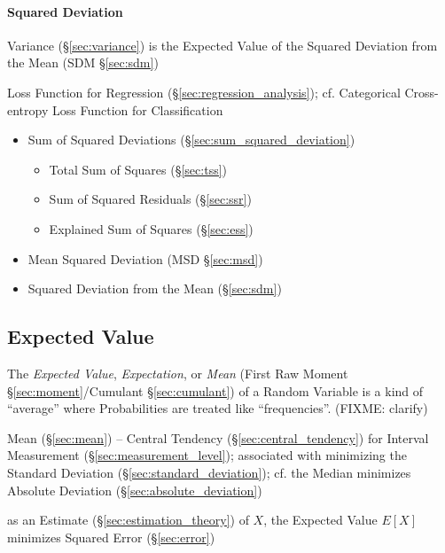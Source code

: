 \paragraph{Squared Deviation}\label{sec:squared_deviation}\hfill

\fist Variance (\S\ref{sec:variance}) is the Expected Value of the Squared
Deviation from the Mean (SDM \S\ref{sec:sdm})

\fist Loss Function for Regression (\S\ref{sec:regression_analysis}); cf.
Categorical Cross-entropy Loss Function for Classification

\begin{itemize}
  \item Sum of Squared Deviations (\S\ref{sec:sum_squared_deviation})
    \begin{itemize}
      \item Total Sum of Squares (\S\ref{sec:tss})
      \item Sum of Squared Residuals (\S\ref{sec:ssr})
      \item Explained Sum of Squares (\S\ref{sec:ess})
    \end{itemize}
  \item Mean Squared Deviation (MSD \S\ref{sec:msd})
  \item Squared Deviation from the Mean (\S\ref{sec:sdm})
\end{itemize}



\subsection{Expected Value}\label{sec:expected_value}

The \emph{Expected Value}, \emph{Expectation}, or \emph{Mean} (First Raw Moment
\S\ref{sec:moment}/Cumulant \S\ref{sec:cumulant}) of a Random Variable is a kind
of ``average'' where Probabilities are treated like ``frequencies''. (FIXME:
clarify)

\fist Mean (\S\ref{sec:mean}) -- Central Tendency (\S\ref{sec:central_tendency})
for Interval Measurement (\S\ref{sec:measurement_level}); associated with
minimizing the Standard Deviation (\S\ref{sec:standard_deviation}); cf. the
Median minimizes Absolute Deviation (\S\ref{sec:absolute_deviation})

as an Estimate (\S\ref{sec:estimation_theory}) of $X$, the Expected Value $E[X]$
minimizes Squared Error (\S\ref{sec:error})

